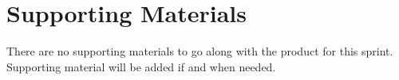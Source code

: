 
\chapter{Supporting Materials}
There are no supporting materials to go along with the product for this sprint. Supporting material will be added if and when needed.

